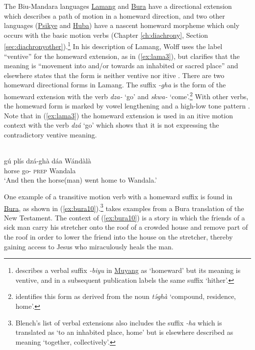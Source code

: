The Biu-Mandara languages \hyperref[lama]{Lamang} and \hyperref[bura]{Bura} have a directional extension which describes a path of motion in a homeward direction, and two other languages (\hyperref[psik]{Psikye} and \hyperref[huba]{Huba}) have a nascent homeward morpheme which only occurs with the basic motion verbs (Chapter \ref{ch:diachrony}, Section \ref{sec:diachronyother}).\footnote{\citet{smithMuyangVerbPhrase2002} describes a verbal suffix \textit{-biyu} in \hyperref[muya]{Muyang} as `homeward' but its meaning is ventive, and in a subsequent publication \citet{smithDefinitenessTopicalisationTheme2003} labels the same suffix `hither'.} In his description of Lamang, Wolff uses the label ``ventive'' for the homeward extension, as in (\ref{ex:lama3}), but clarifies that the  meaning is ``movement into and/or towards an inhabited or sacred place'' \citep[140]{wolffLamangLanguageDictionary2015} and elsewhere states that the form is neither ventive nor itive \citep[234]{wolffEncodingTopographyDirection2006}. There are two homeward directional forms in Lamang. The suffix \textit{-gha} is the form of the homeward extension with the verb \textit{dza-} `go' and \textit{skwa-} `come'.\footnote{\citet[140]{wolffLamangLanguageDictionary2015} identifies this form as derived from the noun \textit{tə́ghà} `compound, residence, home'.} With other verbs, the homeward form is marked by vowel lengthening and a high-low tone pattern \citep[151]{wolffLamangLanguageDictionary2015}. Note that in (\ref{ex:lama3}) the homeward extension is used in an itive motion context with the verb \textit{dzá} `go' which shows that it is not expressing the contradictory ventive meaning.

\ea\label{ex:lama3}
 \\
\gll gú plís dzá-ghà dáa Wándàlà \\
 horse go- \textsc{prep} Wandala \\
\glt `And then the horse(man) went home to Wandala.'
\z 

One example of a transitive motion verb with a homeward suffix is found in \hyperref[bura]{Bura}, as shown in (\ref{ex:bura10}).\footnote{Blench's list of verbal extensions also includes the suffix \textit{-ha} which is translated as `to an inhabited place, home' but is elsewhere described as meaning `together, collectively'.}  \citet{hoffmannUntersuchungenZurStruktur1955} takes examples from a Bura translation of the New Testament. The context of (\ref{ex:bura10}) is a story in which the friends of a sick man carry his stretcher onto the roof of a crowded house and remove part of the roof in order to lower the friend into the house on the stretcher, thereby gaining access to Jesus who miraculously heals the man.

